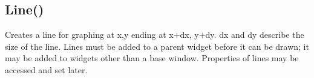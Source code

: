 \documentclass[letterpaper,10pt,english]{sphinxmanual}
\begin{document}
\sphinxAtStartPar
{}

\sphinxAtStartPar
{}

\ignorespaces 

\subsection{Line()}
\label{\detokenize{reference/peblobjects:line}}\label{\detokenize{reference/peblobjects:index-16}}
\sphinxAtStartPar
{}

\sphinxAtStartPar
{}

\sphinxAtStartPar
Creates a line for graphing at x,y ending at x+dx,   y+dy.  dx and dy describe the size of the line.  Lines must be added   to a parent widget before it can be drawn; it may be added to   widgets other than a base window. Properties of lines may be   accessed and set later.

\sphinxAtStartPar
{}

\begin{sphinxVerbatim}[commandchars=\\\{\}]
\end{sphinxVerbatim}

\sphinxAtStartPar
{}

\begin{sphinxVerbatim}[commandchars=\\\{\}]
\end{sphinxVerbatim}

\sphinxAtStartPar
{}
\end{document}
